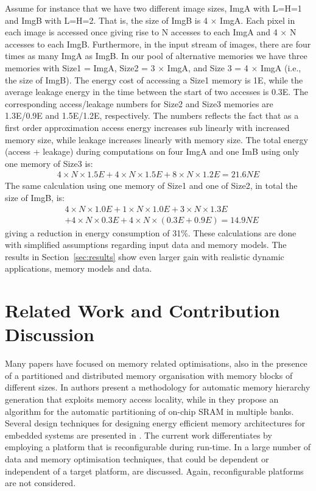 \documentclass[smallcondensed]{svjour3}
\begin{document}
Assume for instance that we have two different image sizes, ImgA with L=H=1 and ImgB with L=H=2. 
That is, the size of ImgB is 4 $\times$ ImgA. 
Each pixel in each image is accessed once giving rise to N accesses to each ImgA and 4 $\times$ N accesses to each ImgB. 
Furthermore, in the input stream of images, there are four times as many ImgA as ImgB. 
In our pool of alternative memories we have three memories with Size1 = ImgA, Size2  = 3 $\times$ ImgA, and Size 3 = 4 $\times$ ImgA (i.e., the size of ImgB). 
The energy cost of accessing a Size1 memory is 1E, while the average leakage energy in the time between the start of two accesses is 0.3E. 
The corresponding access/leakage numbers for Size2 and Size3 memories are 1.3E/0.9E and 1.5E/1.2E, respectively. 
The numbers reflects the fact that as a first order approximation access energy increases sub linearly with increased memory size, while leakage increases linearly with memory size. 
The total energy (access + leakage) during computations on four ImgA and one ImB using only one memory of Size3 is:
\begin{align*}
4 \times N \times 1.5E + 4 \times N \times 1.5E + 8 \times N \times 1.2E = 21.6NE
\end{align*}
The same calculation using one memory of Size1 and one of Size2, in total the size of ImgB, is: 
\begin{align*}
& 4 \times N \times 1.0E + 1 \times N \times 1.0E + 3 \times N \times 1.3E \\
& + 4 \times N \times 0.3E + 4 \times N \times (0.3E + 0.9E) =  14.9NE
\end{align*}
giving a reduction in energy consumption of 31\%. 
These calculations are done with simplified assumptions regarding input data and memory models. 
The results in Section~\ref{sec:results} show even larger gain with realistic dynamic applications, memory models and data.

\section{Related Work and Contribution Discussion}
\label{sec:related}

Many papers have focused on memory related optimisations, also in the presence of a partitioned and distributed memory organisation with memory blocks of different sizes. 
In \cite{Ben00b} authors present a methodology for automatic memory hierarchy generation that exploits memory access locality, while in \cite{Ben00c} they propose an algorithm for the automatic partitioning of on-chip SRAM in multiple banks. 
Several design techniques for designing energy efficient memory architectures for embedded systems are presented in \cite{Mac02}. 
The current work differentiates by employing a platform that is reconfigurable during run-time. 
In \cite{Pgk01} a large number of data and memory optimisation techniques, that could be dependent or independent of a target platform, are discussed. 
Again, reconfigurable platforms are not considered.
\end{document}
